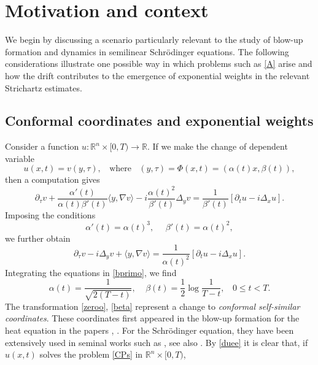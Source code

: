 \documentclass[11pt,letter]{amsart}
\def \R {\mathbb{R}}
\newcommand{\Rn}{\mathbb R^n}
\newcommand{\p}{\partial}
\numberwithin{equation}{section}
\newcommand{\sa}{\langle}
\newcommand{\da}{\rangle}
\numberwithin{equation}{section}
\begin{document}
\vskip 0.2in

\section{Motivation and context}\label{S:mot}

We begin by discussing a scenario particularly relevant to the study of blow-up formation and dynamics in semilinear Schr\"odinger equations. The following considerations illustrate one possible way in which problems such as \eqref{A} arise
and how the drift contributes to the emergence of exponential weights in the relevant Strichartz estimates.





\subsection{Conformal coordinates and exponential weights}\label{S:exp}
Consider a function $u:\Rn\times [0,T)\to \R$. If we make the change of dependent variable
\begin{equation}\label{zeroo}
u(x,t) = v(y,\tau),\ \ \ \ \text{where}\ \ \ \ (y,\tau) = \Phi(x,t) = (\alpha(t) x,\beta(t)),
\end{equation}
then a computation gives
\begin{equation*}
\p_\tau v + \frac{\alpha'(t)}{\alpha(t)\beta'(t)} \sa y,\nabla v\da - i \frac{\alpha(t)^2}{\beta'(t)} \Delta_y v = \frac{1}{\beta'(t)} \left[\p_t u - i \Delta_x u\right].
\end{equation*}
Imposing the conditions 
\begin{equation}\label{bprimo}
\alpha'(t) = \alpha(t)^3,\ \ \ \ \ \ \beta'(t) = \alpha(t)^2,
\end{equation}
we further obtain 
\begin{equation}\label{duee}
\p_\tau v - i  \Delta_y v  + \sa y,\nabla v\da = \frac{1}{\alpha(t)^2} \left[\p_t u - i \Delta_x u\right].
\end{equation}
Integrating the equations in \eqref{bprimo}, we find
\begin{equation}\label{beta}
\alpha(t) = \frac{1}{\sqrt{2(T-t)}},\ \ \ \ \ \beta(t) = \frac 12 \log \frac{1}{T-t},\ \ \ \ 0\le t<T.
\end{equation}
The transformation \eqref{zeroo}, \eqref{beta} represent a change to \emph{conformal self-similar coordinates}. These coordinates first appeared in the blow-up formation for the heat equation in the papers \cite{We}, \cite{GK}. For the Schr\"odinger equation, they have been extensively used in seminal works such as \cite{MR,MR2,MR3,MRS2,MRS}, see also \cite{Su}.  By \eqref{duee} it is clear that, if $u(x,t)$ solves the problem \eqref{CPs} in $\Rn\times [0,T)$, 
\end{document}
